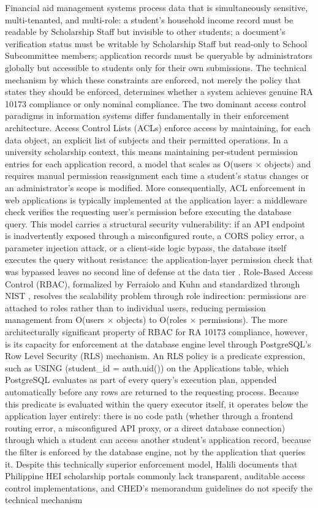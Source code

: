 Financial aid management systems process data that is simultaneously sensitive, multi-tenanted, and multi-role: a student's household income record must be readable by Scholarship Staff but invisible to other students; a document's verification status must be writable by Scholarship Staff but read-only to School Subcommittee members; application records must be queryable by administrators globally but accessible to students only for their own submissions. The technical mechanism by which these constraints are enforced, not merely the policy that states they should be enforced, determines whether a system achieves genuine RA 10173 compliance or only nominal compliance. The two dominant access control paradigms in information systems differ fundamentally in their enforcement architecture. Access Control Lists (ACLs) enforce access by maintaining, for each data object, an explicit list of subjects and their permitted operations. In a university scholarship context, this means maintaining per-student permission entries for each application record, a model that scales as O(users $\times$ objects) and requires manual permission reassignment each time a student's status changes or an administrator's scope is modified. More consequentially, ACL enforcement in web applications is typically implemented at the application layer: a middleware check verifies the requesting user's permission before executing the database query. This model carries a structural security vulnerability: if an API endpoint is inadvertently exposed through a misconfigured route, a CORS policy error, a parameter injection attack, or a client-side logic bypass, the database itself executes the query without resistance: the application-layer permission check that was bypassed leaves no second line of defense at the data tier \cite{ref38}. Role-Based Access Control (RBAC), formalized by Ferraiolo and Kuhn \cite{ref24} and standardized through NIST \cite{ref35}, resolves the scalability problem through role indirection: permissions are attached to roles rather than to individual users, reducing permission management from O(users $\times$ objects) to O(roles $\times$ permissions). The more architecturally significant property of RBAC for RA 10173 compliance, however, is its capacity for enforcement at the database engine level through PostgreSQL's Row Level Security (RLS) mechanism. An RLS policy is a predicate expression, such as USING (student\_id = auth.uid()) on the Applications table, which PostgreSQL evaluates as part of every query's execution plan, appended automatically before any rows are returned to the requesting process. Because this predicate is evaluated within the query executor itself, it operates below the application layer entirely: there is no code path (whether through a frontend routing error, a misconfigured API proxy, or a direct database connection) through which a student can access another student's application record, because the filter is enforced by the database engine, not by the application that queries it. Despite this technically superior enforcement model, Halili \cite{ref26} documents that Philippine HEI scholarship portals commonly lack transparent, auditable access control implementations, and CHED's memorandum guidelines \cite{ref18} do not specify the technical mechanism 